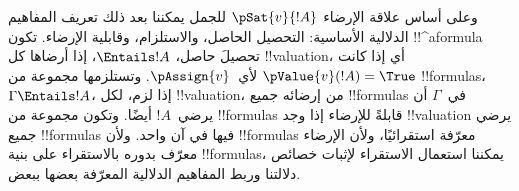 \documentclass[../../../include/open-logic-section]{subfiles}
\begin{document}
وعلى أساس علاقة الإرضاء $\pSat{v}{!A}$ للجمل يمكننا بعد ذلك تعريف
المفاهيم الدلالية الأساسية: التحصيل الحاصل، والاستلزام، وقابلية
الإرضاء. تكون !!^a{formula} تحصيلَ حاصل، $\Entails !A$، إذا أرضاها كل
!!{valuation}، أي إذا كانت $\pValue{v}(!A) = \True$ لأي~$\pAssign{v}$.
وتستلزمها مجموعة من !!{formula}s، $\Gamma \Entails !A$، إذا لزم، لكل
!!{valuation}، من إرضائه جميع !!{formula}s في~$\Gamma$ أن يرضي~$!A$
أيضًا. وتكون
مجموعة من !!{formula}s قابلةً للإرضاء إذا وجد !!{valuation} يرضي جميع
!!{formula}s فيها في آن واحد. ولأن !!{formula}s معرّفة استقرائيًا،
ولأن الإرضاء معرّف بدوره بالاستقراء على بنية !!{formula}s، يمكننا
استعمال الاستقراء لإثبات خصائص دلالتنا وربط المفاهيم الدلالية المعرّفة
بعضها ببعض.
\end{document}
